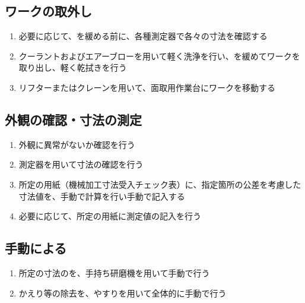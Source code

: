 \subsection{ワークの取外し}
\begin{enumerate}[label=\sarrow]
\item 必要に応じて、\FixtureBolt を緩める前に、各種測定器で各々の寸法を確認する
\item {}クーラントおよびエアーブローを用いて軽く洗浄を行い、\FixtureBolt を緩めてワークを取り出し、軽く乾拭きを行う
\item {}リフターまたはクレーンを用いて、面取用作業台にワークを移動する
\end{enumerate}


\subsection{外観の確認・寸法の測定}
\begin{enumerate}[label=\sarrow]
\item {}外観に異常がないか確認を行う
\item {}測定器を用いて寸法の確認を行う
\item 所定の用紙（機械加工寸法受入チェック表）に、指定箇所の公差を考慮した寸法値を、手動で計算を行い手動で記入する
\item 必要に応じて、所定の用紙に測定値の記入を行う
\end{enumerate}


\subsection{手動による\EndFaceChamferMilling}
\begin{enumerate}[label=\sarrow]
\item 所定の寸法の\EndFaceChamfer を、手持ち研磨機を用いて手動で行う
\item {}かえり等の除去を、やすりを用いて全体的に手動で行う
\end{enumerate}


